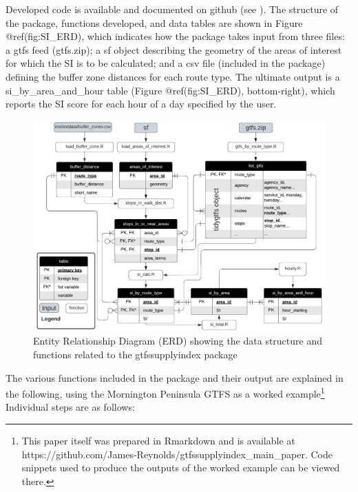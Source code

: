 \documentclass[preprint, 3p,
authoryear]{elsarticle} %
\begin{document}
Developed code is available and documented on github (see
\citet{gtfssupplyindex_github}). The structure of the package, functions
developed, and data tables are shown in Figure @ref(fig:SI\_ERD), which
indicates how the package takes input from three files: a gtfs feed
(gtfs.zip); a sf object describing the geometry of the areas of interest
for which the SI is to be calculated; and a csv file (included in the
package) defining the buffer zone distances for each route type. The
ultimate output is a si\_by\_area\_and\_hour table (Figure
@ref(fig:SI\_ERD), bottom-right), which reports the SI score for each
hour of a day specified by the user.

\begin{figure}
\includegraphics[width=1\linewidth]{graphics/SI_data_structure} \caption{Entity Relationship Diagram (ERD) showing the data structure and functions related to the gtfssupplyindex package}\label{fig:SI_ERD}
\end{figure}

The various functions included in the package and their output are
explained in the following, using the Mornington Peninsula GTFS as a
worked example\footnote{This paper itself was prepared in Rmarkdown and
  is available at
  https://github.com/James-Reynolds/gtfssupplyindex\_main\_paper. Code
  snippets used to produce the outputs of the worked example can be
  viewed there.} Individual steps are as follows:
\end{document}
